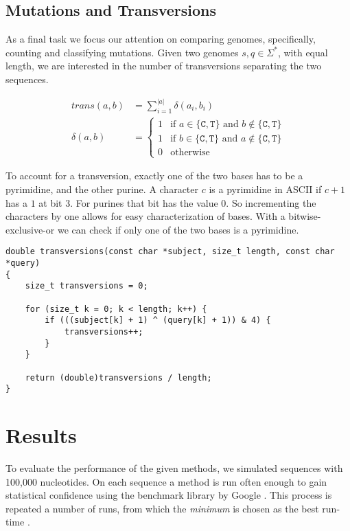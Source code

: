 \documentclass[10pt,letterpaper]{article}
\begin{document}
\subsection{Mutations and Transversions}
\label{sec:transversions}

As a final task we focus our attention on comparing genomes, specifically, counting and classifying mutations. Given two genomes $s,q \in \Sigma^*$, with equal length, we are interested in the number of transversions separating the two sequences.

\begin{align*}
    \mathit{trans}(a,b) &= \sum_{i=1}^{|a|} \delta(a_i,b_i) \\
    \delta(a,b) &= \begin{cases}
        1 & \text{if } a \in \{\texttt{C},\texttt{T}\} \text{ and } b \not\in \{\texttt{C},\texttt{T}\} \\
        1 & \text{if } b \in \{\texttt{C},\texttt{T}\} \text{ and } a \not\in \{\texttt{C},\texttt{T}\} \\
        0 & \text{otherwise}
    \end{cases}
\end{align*}

To account for a transversion, exactly one of the two bases has to be a pyrimidine, and the other purine. A character $c$ is a pyrimidine in ASCII if $c + 1$ has a $1$ at bit 3. For purines that bit has the value $0$. So incrementing the characters by one allows for easy characterization of bases. With a bitwise-exclusive-or we can check if only one of the two bases is a pyrimidine.

\begin{lstlisting}
double transversions(const char *subject, size_t length, const char *query)
{
    size_t transversions = 0;

    for (size_t k = 0; k < length; k++) {
        if (((subject[k] + 1) ^ (query[k] + 1)) & 4) {
            transversions++;
        }
    }

    return (double)transversions / length;
}
\end{lstlisting}


\section{Results}

To evaluate the performance of the given methods, we simulated sequences with 100{,}000 nucleotides. On each sequence a method is run often enough to gain statistical confidence using the benchmark library by Google \cite{bench}. This process is repeated a number of runs, from which the \emph{minimum} is chosen as the best run-time \cite{min}.
\end{document}
